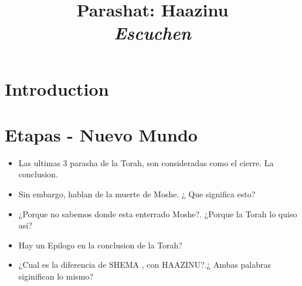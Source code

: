 \documentclass[conference]{IEEEtran}
\title{Parashat: Haazinu \\ \textit{Escuchen}}
\author{\IEEEauthorblockN{Kunst, James Jules Waldemar}
\IEEEauthorblockA{Bet-Melej Haba}}
\begin{document}
\maketitle


\section{Introduction}



\section{Etapas - Nuevo Mundo}
\begin{itemize}
\item
Las ultimas 3 parasha de la Torah, son consideradas como el cierre. La conclusion.
\item
Sin embargo, hablan de la muerte de Moshe. ¿ Que significa esto?
\item 
¿Porque no sabemos donde esta enterrado Moshe?. ¿Porque la Torah lo quiso asi?
\item
Hay un Epilogo en la conclusion de la Torah?
\item
¿Cual es la diferencia de SHEMA , con HAAZINU?.¿ Ambas palabras siginifican lo mismo?
\end{itemize}







\end{document}
